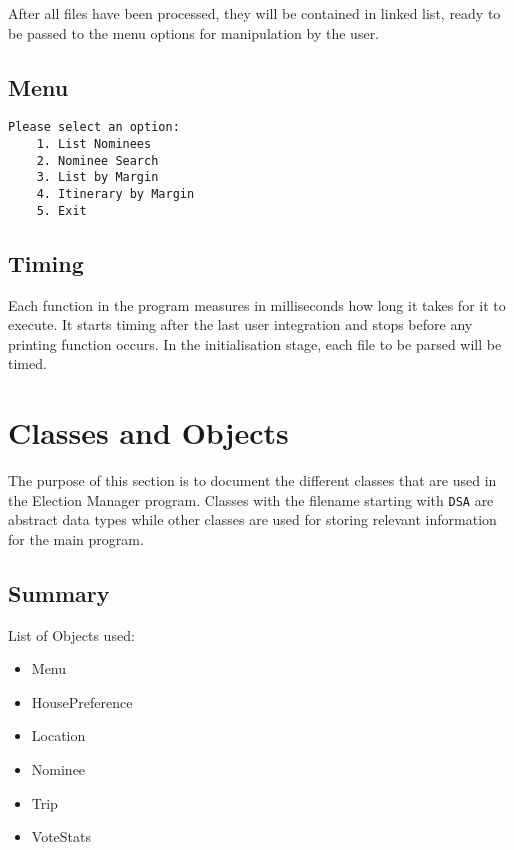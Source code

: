 \documentclass[a4paper, 12pt, titlepage]{article}
\newcommand{\code}[1]{\small\texttt{#1}\normalsize}
\begin{document}
After all files have been processed, they will be contained in linked list,
ready to be passed to the menu options for manipulation by the user.

\subsection{Menu}

\begin{lstlisting}
Please select an option:
    1. List Nominees
    2. Nominee Search
    3. List by Margin
    4. Itinerary by Margin
    5. Exit
\end{lstlisting}

\subsection{Timing}

Each function in the program measures in milliseconds how long it takes
for it to execute. It starts timing after the last user integration and
stops before any printing function occurs. In the initialisation stage,
each file to be parsed will be timed.

\newpage

\section{Classes and Objects}

The purpose of this section is to document the different classes that are used
in the Election Manager program. Classes with the filename starting with
\code{DSA} are abstract data types while other classes are used for storing
relevant information for the main program.

\subsection{Summary}

List of Objects used:
\begin{itemize}[label={--}]
    \item Menu
    \item HousePreference
    \item Location
    \item Nominee
    \item Trip
    \item VoteStats
\end{itemize}
\end{document}
